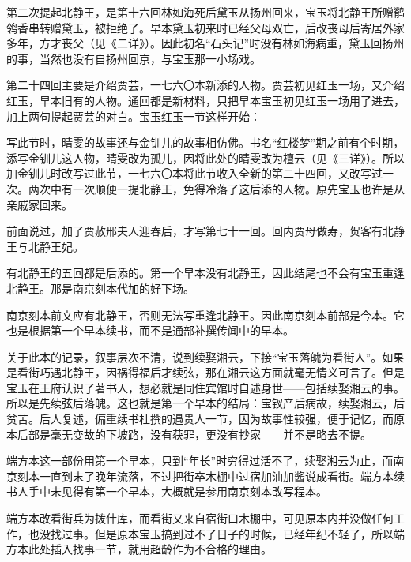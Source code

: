 \par 第二次提起北静王，是第十六回林如海死后黛玉从扬州回来，宝玉将北静王所赠鹡鸰香串转赠黛玉，被拒绝了。早本黛玉初来时已经父母双亡，后改丧母后寄居外家多年，方才丧父（见《二详》）。因此初名“石头记”时没有林如海病重，黛玉回扬州的事，当然也没有自扬州回京，与宝玉那一小场戏。
\par 第二十四回主要是介绍贾芸，一七六〇本新添的人物。贾芸初见红玉一场，又介绍红玉，早本旧有的人物。通回都是新材料，只把早本宝玉初见红玉一场用了进去，加上两句提起贾芸的对白。宝玉红玉一节这样开始：
\par 写此节时，晴雯的故事还与金钏儿的故事相仿佛。书名“红楼梦”期之前有个时期，添写金钏儿这人物，晴雯改为孤儿，因将此处的晴雯改为檀云（见《三详》）。所以加金钏儿时改写过此节，一七六〇本将此节收入全新的第二十四回，又改写过一次。两次中有一次顺便一提北静王，免得冷落了这后添的人物。原先宝玉也许是从亲戚家回来。
\par 前面说过，加了贾赦邢夫人迎春后，才写第七十一回。回内贾母做寿，贺客有北静王与北静王妃。
\par 有北静王的五回都是后添的。第一个早本没有北静王，因此结尾也不会有宝玉重逢北静王。那是南京刻本代加的好下场。
\par 南京刻本前文应有北静王，否则无法写重逢北静王。因此南京刻本前部是今本。它也是根据第一个早本续书，而不是通部补撰传闻中的早本。
\par 关于此本的记录，叙事层次不清，说到续娶湘云，下接“宝玉落魄为看街人”。如果是看街巧遇北静王，因祸得福后才续弦，那在湘云这方面就毫无情义可言了。但是宝玉在王府认识了著书人，想必就是同住宾馆时自述身世——包括续娶湘云的事。所以是先续弦后落魄。这也就是第一个早本的结局：宝钗产后病故，续娶湘云，后贫苦。后人复述，偏重续书杜撰的遇贵人一节，因为故事性较强，便于记忆，而原本后部是毫无变故的下坡路，没有获罪，更没有抄家——并不是略去不提。
\par 端方本这一部份用第一个早本，只到“年长”时穷得过活不了，续娶湘云为止，而南京刻本一直到末了晚年流落，不过把街卒木棚中过宿加油加酱说成看街。端方本续书人手中未见得有第一个早本，大概就是参用南京刻本改写程本。
\par 端方本改看街兵为拨什库，而看街又来自宿街口木棚中，可见原本内并没做任何工作，也没找过事。但是原本宝玉搞到过不了日子的时候，已经年纪不轻了，所以端方本此处插入找事一节，就用超龄作为不合格的理由。
